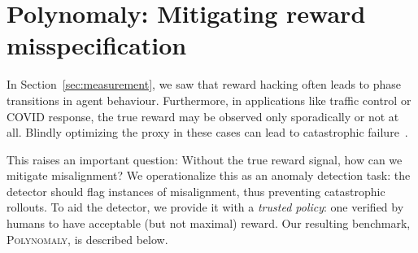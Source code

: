 \section{Polynomaly: Mitigating reward misspecification}\label{sec:detection}
%     
In Section~\ref{sec:measurement}, we saw that reward hacking often leads to phase transitions in agent behaviour. Furthermore, in applications like traffic control or COVID response, the true reward may be observed only sporadically or not at all. %
Blindly optimizing the proxy in these cases can lead to catastrophic failure~\citep{zhuang2020misaligned, taylor2016impossibility}. 


This raises an important question: Without the true reward signal, how can we mitigate misalignment? We operationalize this as an anomaly detection task: the detector should flag instances of misalignment, thus preventing catastrophic rollouts. To aid the detector, we provide it with a \emph{trusted policy}: one verified by humans to have acceptable (but not maximal) reward. Our resulting benchmark, \textsc{Polynomaly}, is described below.

%    

